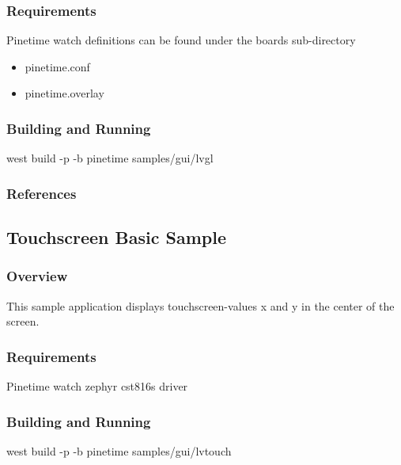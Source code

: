 \documentclass[letterpaper,10pt,english]{sphinxmanual}
\begin{document}
\subsubsection{Requirements}
\label{\detokenize{samples/gui/lvgl/README:requirements}}
Pinetime watch
definitions can be found under the boards sub-directory
\begin{itemize}
\item {} 
pinetime.conf

\item {} 
pinetime.overlay

\end{itemize}


\subsubsection{Building and Running}
\label{\detokenize{samples/gui/lvgl/README:building-and-running}}
west build -p -b pinetime samples/gui/lvgl


\subsubsection{References}
\label{\detokenize{samples/gui/lvgl/README:references}}

\subsection{Touchscreen Basic Sample}
\label{\detokenize{samples/gui/lvtouch/README:touchscreen-basic-sample}}\label{\detokenize{samples/gui/lvtouch/README:touchscreen-sample}}\label{\detokenize{samples/gui/lvtouch/README::doc}}

\subsubsection{Overview}
\label{\detokenize{samples/gui/lvtouch/README:overview}}
This sample application displays touchscreen-values x and y in the center of the screen.


\subsubsection{Requirements}
\label{\detokenize{samples/gui/lvtouch/README:requirements}}
Pinetime watch
zephyr cst816s driver


\subsubsection{Building and Running}
\label{\detokenize{samples/gui/lvtouch/README:building-and-running}}
west build -p -b pinetime samples/gui/lvtouch
\end{document}
